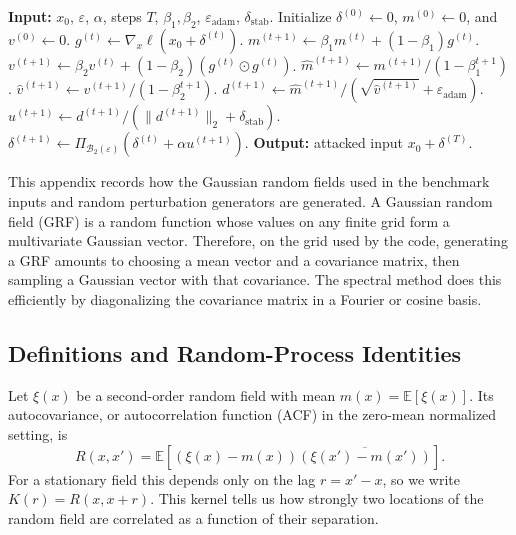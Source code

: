 \begin{algorithm}[H]
\caption{Adam-adapted PGD update for the perturbation under an $L_2$ constraint}
\begin{algorithmic}[1]
\STATE \textbf{Input:} $x_0$, $\varepsilon$, $\alpha$, steps $T$,
$\beta_1,\beta_2$, $\varepsilon_{\mathrm{adam}}$, $\delta_{\mathrm{stab}}$.
\STATE Initialize $\delta^{(0)}\leftarrow0$, $m^{(0)}\leftarrow0$, and $v^{(0)}\leftarrow0$.
  \STATE $g^{(t)}\leftarrow\nabla_x\ell(x_0+\delta^{(t)})$.
  \STATE $m^{(t+1)}\leftarrow\beta_1m^{(t)}+(1-\beta_1)g^{(t)}$.
  \STATE $v^{(t+1)}\leftarrow\beta_2v^{(t)}+(1-\beta_2)(g^{(t)}\odot g^{(t)})$.
  \STATE $\hat m^{(t+1)}\leftarrow m^{(t+1)}/(1-\beta_1^{t+1})$.
  \STATE $\hat v^{(t+1)}\leftarrow v^{(t+1)}/(1-\beta_2^{t+1})$.
  \STATE $d^{(t+1)}\leftarrow
  \hat m^{(t+1)}/(\sqrt{\hat v^{(t+1)}}+\varepsilon_{\mathrm{adam}})$.
  \STATE $u^{(t+1)}\leftarrow d^{(t+1)}/(\|d^{(t+1)}\|_2+\delta_{\mathrm{stab}})$.
  \STATE $\delta^{(t+1)}\leftarrow
  \Pi_{\mathcal B_2(\varepsilon)}(\delta^{(t)}+\alpha u^{(t+1)})$.
\ENDFOR
\STATE \textbf{Output:} attacked input $x_0+\delta^{(T)}$.
\end{algorithmic}
\end{algorithm}

\clearpage
{}
\vspace{0.4em}
\noindent
This appendix records how the Gaussian random fields used in the benchmark
inputs and random perturbation generators are generated. A Gaussian random field
(GRF) is a random function whose values on any finite grid form a multivariate
Gaussian vector. Therefore, on the grid used by the code, generating a GRF
amounts to choosing a mean vector and a covariance matrix, then sampling a
Gaussian vector with that covariance. The spectral method does this efficiently
by diagonalizing the covariance matrix in a Fourier or cosine basis.
\vspace{0.75em}

\subsection*{Definitions and Random-Process Identities}

Let $\xi(x)$ be a second-order random field with mean
$m(x)=\mathbb E[\xi(x)]$. Its autocovariance, or autocorrelation function (ACF)
in the zero-mean normalized setting, is
\begin{equation}
  R(x,x')
  =
  \mathbb E\!\left[
    (\xi(x)-m(x))\overline{(\xi(x')-m(x'))}
  \right].
\end{equation}
For a stationary field this depends only on the lag
$r=x'-x$, so we write $K(r)=R(x,x+r)$. This kernel tells us how strongly two
locations of the random field are correlated as a function of their separation.


